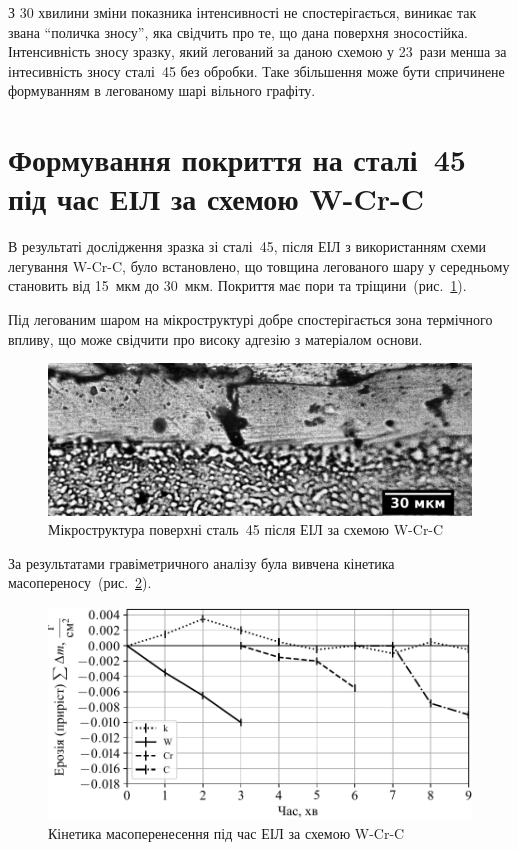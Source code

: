 \documentclass[a4paper,fontsize=14bp,ukrainian]{extreport}
\begin{document}
З 30 хвилини зміни показника інтенсивності не спостерігається, виникає так звана ``поличка зносу'', яка свідчить про те, що дана поверхня зносостійка. Інтенсивність зносу зразку, який легований за даною схемою у 23~рази менша за інтесивність зносу сталі~45 без обробки. Таке збільшення може бути спричинене формуванням в легованому шарі вільного графіту.

\section{Формування покриття на сталі~45 під час ЕІЛ за схемою W-Cr-C}

В результаті дослідження зразка зі сталі~45, після ЕІЛ з використанням схеми легування W-Cr-C, було встановлено, що товщина легованого шару у середньому становить від 15~мкм до 30~мкм. Покриття має пори та тріщини~(рис.~\ref{fig:adapt_microstr_W-Cr-C}).

Під легованим шаром на мікроструктурі добре спостерігається зона термічного впливу, що може свідчити про високу адгезію з матеріалом основи.

\begin{figure}[H]
\centering \includegraphics[width=\textwidth]{adapt_gray_microstr_W-Cr-C.jpg}
\caption{Мікроструктура поверхні сталь~45 після ЕІЛ за схемою W-Cr-C}
\label{fig:adapt_microstr_W-Cr-C}
\end{figure}

За результатами гравіметричного аналізу була вивчена кінетика масопереносу~(рис.~\ref{fig:plt_gravi_W-Cr-C}).

\begin{figure}[H]
\centering \includegraphics[]{plt_gravi_W-Cr-C.pdf}
\caption{Кінетика масоперенесення під час ЕІЛ за схемою W-Cr-C}
\label{fig:plt_gravi_W-Cr-C}
\end{figure}
\end{document}
